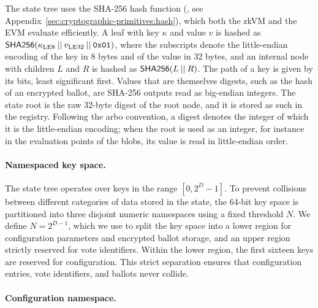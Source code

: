 The state tree uses the SHA-256 hash function (\hlget{\Sha}, see Appendix~\ref{sec:cryptographic-primitives:hash}), which both the \ac{zkVM} and the \ac{EVM} evaluate efficiently. A leaf with key $\kappa$ and value $v$ is hashed as ${\sf{SHA256}}(\kappa_{\text{LE8}} \:||\: v_{\text{LE32}} \:||\: \texttt{0x01})$, where the subscripts denote the little-endian encoding of the key in 8 bytes and of the value in 32 bytes, and an internal node with children $L$ and $R$ is hashed as ${\sf{SHA256}}(L \:||\: R)$. The path of a key is given by its bits, least significant first. Values that are themselves digests, such as the hash of an encrypted ballot, are SHA-256 outputs read as big-endian integers. The state root is the raw 32-byte digest of the root node, and it is stored as such in the registry. Following the arbo convention, a digest denotes the integer of which it is the little-endian encoding; when the root is used as an integer, for instance in the evaluation points of the blobs, its value is read in little-endian order.

\paragraph{Namespaced key space.}

The state tree operates over keys in the range $[0, 2^D-1]$. To prevent collisions between different categories of data stored in the state, the 64-bit key space is partitioned into three disjoint numeric namespaces using a fixed threshold $N$. We define \( N = 2^{D-1}\),
which we use to split the key space into a lower region for configuration parameters and encrypted ballot storage, and an upper region strictly reserved for vote identifiers. Within the lower region, the first sixteen keys are reserved for configuration. This strict separation ensures that configuration entries, vote identifiers, and ballots never collide.

\paragraph{Configuration namespace.}

